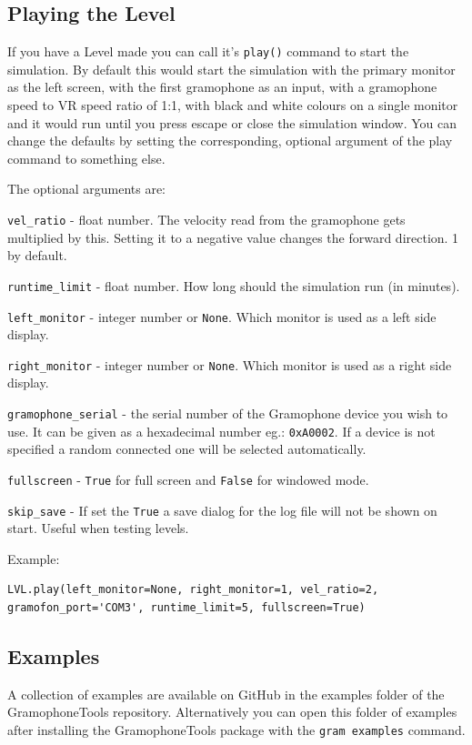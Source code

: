 \documentclass[11pt,a4paper]{article}
\newcommand{\param}[1]{\item \texttt{#1} -}
\begin{document}
\subsection{Playing the Level}
If you have a Level made you can call it's \texttt{play()} command to start the simulation. By default this would start the simulation with the primary monitor as the left screen, with the first gramophone as an input, with a gramophone speed to VR speed ratio of 1:1, with black and white colours on a single monitor and it would run until you press escape or close the simulation window. You can change the defaults by setting the corresponding, optional argument of the play command to something else.


The optional arguments are:
\begin{paramlist}

\param{vel\_ratio} float number. The velocity read from the gramophone gets multiplied by this. Setting it to a negative value changes the forward direction. 1 by default.
\param{runtime\_limit} float number. How long should the simulation run (in minutes).
\param{left\_monitor} integer number or \lstinline{None}. Which monitor is used as a left side display.
\param{right\_monitor} integer number or \lstinline{None}. Which monitor is used as a right side display.
\param{gramophone\_serial} the serial number of the Gramophone device you wish to use. It can be given as a hexadecimal number eg.: \lstinline{0xA0002}. If a device is not specified a random connected one will be selected automatically.
\param{fullscreen} \lstinline{True} for full screen and \lstinline{False} for windowed mode.
\param{skip\_save} If set the \lstinline{True} a save dialog for the log file will not be shown on start. Useful when testing levels.
\end{paramlist}


Example:

\begin{lstlisting}
LVL.play(left_monitor=None, right_monitor=1, vel_ratio=2, gramofon_port='COM3', runtime_limit=5, fullscreen=True)
\end{lstlisting}

\subsection{Examples}
A collection of examples are available on GitHub in the examples folder of the GramophoneTools repository. Alternatively you can open this folder of examples after installing the GramophoneTools package with the \texttt{gram examples} command.
\end{document}
